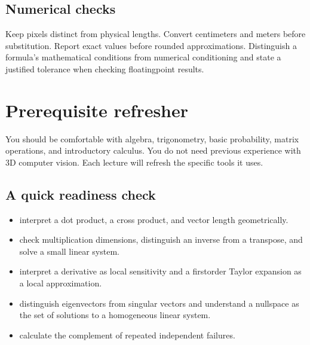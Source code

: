 \documentclass[letterpaper,11pt,english,openany,oneside]{jupyterBook}
\begin{document}
\section{Numerical checks}
\label{\detokenize{foundations/notation:numerical-checks}}
\sphinxAtStartPar
Keep pixels distinct from physical lengths. Convert centimeters and meters before substitution. Report exact values before rounded approximations. Distinguish a formula’s mathematical conditions from numerical conditioning and state a justified tolerance when checking floating\sphinxhyphen{}point results.

\sphinxstepscope


\chapter{Prerequisite refresher}
\label{\detokenize{foundations/prerequisites:prerequisite-refresher}}\label{\detokenize{foundations/prerequisites:prerequisites}}\label{\detokenize{foundations/prerequisites::doc}}
\sphinxAtStartPar
You should be comfortable with algebra, trigonometry, basic probability, matrix operations, and introductory calculus. You do not need previous experience with 3D computer vision. Each lecture will refresh the specific tools it uses.


\section{A quick readiness check}
\label{\detokenize{foundations/prerequisites:a-quick-readiness-check}}\begin{itemize}
\item {}
\sphinxAtStartPar
{} interpret a dot product, a cross product, and vector length geometrically.

\item {}
\sphinxAtStartPar
{} check multiplication dimensions, distinguish an inverse from a transpose, and solve a small linear system.

\item {}
\sphinxAtStartPar
{} interpret a derivative as local sensitivity and a first\sphinxhyphen{}order Taylor expansion as a local approximation.

\item {}
\sphinxAtStartPar
{} distinguish eigenvectors from singular vectors and understand a nullspace as the set of solutions to a homogeneous linear system.

\item {}
\sphinxAtStartPar
{} calculate the complement of repeated independent failures.

\end{itemize}
\end{document}
